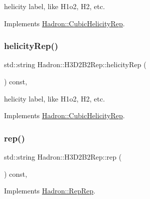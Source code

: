 helicity label, like H1o2, H2, etc. 

Implements \mbox{\hyperlink{structHadron_1_1CubicHelicityRep_af1096946b7470edf0a55451cc662f231}{Hadron\+::\+Cubic\+Helicity\+Rep}}.

\mbox{\label{structHadron_1_1H3D2B2Rep_a3e941d14c5dea81e231504962222c3c5}} 
\subsubsection{\texorpdfstring{helicityRep()}{helicityRep()}\hspace{0.1cm}{\footnotesize\ttfamily [3/3]}}
{\footnotesize\ttfamily std\+::string Hadron\+::\+H3\+D2\+B2\+Rep\+::helicity\+Rep (\begin{DoxyParamCaption}{ }\end{DoxyParamCaption}) const\hspace{0.3cm}{\ttfamily [inline]}, {\ttfamily [virtual]}}

helicity label, like H1o2, H2, etc. 

Implements \mbox{\hyperlink{structHadron_1_1CubicHelicityRep_af1096946b7470edf0a55451cc662f231}{Hadron\+::\+Cubic\+Helicity\+Rep}}.

\mbox{\label{structHadron_1_1H3D2B2Rep_af5ed865d7a3f08904144cb23f152ecb5}} 
\subsubsection{\texorpdfstring{rep()}{rep()}\hspace{0.1cm}{\footnotesize\ttfamily [1/5]}}
{\footnotesize\ttfamily std\+::string Hadron\+::\+H3\+D2\+B2\+Rep\+::rep (\begin{DoxyParamCaption}{ }\end{DoxyParamCaption}) const\hspace{0.3cm}{\ttfamily [inline]}, {\ttfamily [virtual]}}



Implements \mbox{\hyperlink{structHadron_1_1RepRep_ab3213025f6de249f7095892109575fde}{Hadron\+::\+Rep\+Rep}}.

\mbox{\label{structHadron_1_1H3D2B2Rep_af5ed865d7a3f08904144cb23f152ecb5}} 
